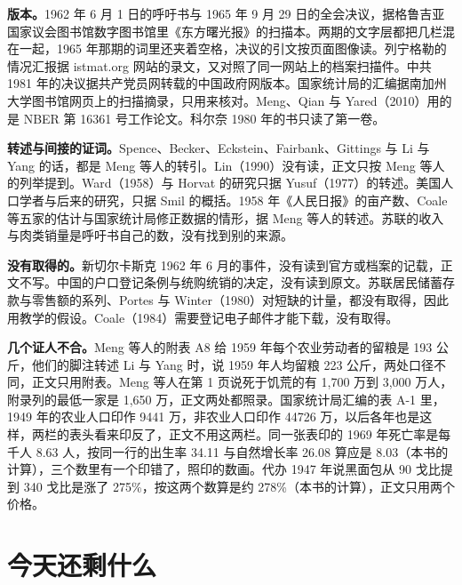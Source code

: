 \begin{deeper}[史料说明]
\textbf{版本。}1962 年 6 月 1 日的呼吁书与 1965 年 9 月 29 日的全会决议，据格鲁吉亚国家议会图书馆数字图书馆里《东方曙光报》的扫描本。两期的文字层都把几栏混在一起，1965 年那期的词里还夹着空格，决议的引文按页面图像读。列宁格勒的情况汇报据 istmat.org 网站的录文，又对照了同一网站上的档案扫描件。中共 1981 年的决议据共产党员网转载的中国政府网版本。国家统计局的汇编据南加州大学图书馆网页上的扫描摘录，只用来核对。Meng、Qian 与 Yared（2010）用的是 NBER 第 16361 号工作论文。科尔奈 1980 年的书只读了第一卷。

\textbf{转述与间接的证词。}Spence、Becker、Eckstein、Fairbank、Gittings 与 Li 与 Yang 的话，都是 Meng 等人的转引。Lin（1990）没有读，正文只按 Meng 等人的列举提到。Ward（1958）与 Horvat 的研究只据 Yusuf（1977）的转述。美国人口学者与后来的研究，只据 Smil 的概括。1958 年《人民日报》的亩产数、Coale 等五家的估计与国家统计局修正数据的情形，据 Meng 等人的转述。苏联的收入与肉类销量是呼吁书自己的数，没有找到别的来源。

\textbf{没有取得的。}新切尔卡斯克 1962 年 6 月的事件，没有读到官方或档案的记载，正文不写。中国的户口登记条例与统购统销的决定，没有读到原文。苏联居民储蓄存款与零售额的系列、Portes 与 Winter（1980）对短缺的计量，都没有取得，因此用教学的假设。Coale（1984）需要登记电子邮件才能下载，没有取得。

\textbf{几个证人不合。}Meng 等人的附表 A8 给 1959 年每个农业劳动者的留粮是 193 公斤，他们的脚注转述 Li 与 Yang 时，说 1959 年人均留粮 223 公斤，两处口径不同，正文只用附表。Meng 等人在第 1 页说死于饥荒的有 1,700 万到 3,000 万人，附录列的最低一家是 1,650 万，正文两处都照录。国家统计局汇编的表 A-1 里，1949 年的农业人口印作 9441 万，非农业人口印作 44726 万，以后各年也是这样，两栏的表头看来印反了，正文不用这两栏。同一张表印的 1969 年死亡率是每千人 8.63 人，按同一行的出生率 34.11 与自然增长率 26.08 算应是 8.03（本书的计算），三个数里有一个印错了，照印的数画。代办 1947 年说黑面包从 90 戈比提到 340 戈比是涨了 275\%，按这两个数算是约 278\%（本书的计算），正文只用两个价格。
\end{deeper}

\section{今天还剩什么}\label{sec:planned-legacy}


